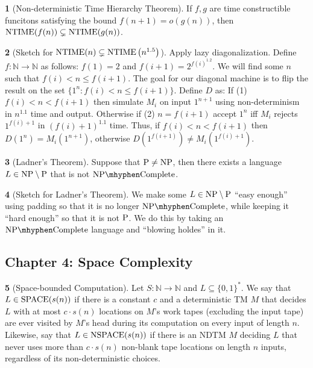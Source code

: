 \documentclass[10pt]{article}
\theoremstyle{definition}
\newtheorem{note}{}[section]
\begin{document}
\begin{note}[Non-deterministic Time Hierarchy Theorem]
  If $f, g$ are time constructible funcitons satisfying the bound
  $f(n + 1) = o(g(n))$,
  then $\mathrm{NTIME}(f(n)) \subsetneq \mathrm{NTIME}(g(n))$.
\end{note}

\begin{note}[Sketch for $\mathrm{NTIME}(n) \subsetneq \mathrm{NTIME}\left(n^{1.5}\right)$]
Apply lazy diagonalization.
Define $f : \mathbb{N} \to \mathbb{N}$ as follows: $f(1) = 2$
and $f(i + 1) = 2^{f(i)^{1.2}}$.
We will find some $n$ such that $f(i) < n \leq f(i + 1)$.
The goal for our diagonal machine is to flip the result on the
set $\{ 1^n : f(i) < n \leq f(i + 1)\}$.
Define $D$ as:
If (1) $f(i) < n < f(i + 1)$ then simulate $M_i$ on input $1 ^{n + 1}$ using
non-determinism in $n^{1.1}$ time and output.
Otherwise if (2) $n = f(i + 1)$ accept $1^n$ iff $M_i$ rejects
$1^{f(i) + 1}$ in $(f(i) + 1)^{1.1}$ time.
Thus, if $f(i) < n < f(i + 1)$ then
$D\left(1^n\right) = M_i \left(1^{n + 1}\right)$, otherwise
$D\left(1^{f(i + 1)}\right) \neq M_i \left(1^{f(i) + 1}\right)$.
\end{note}

\begin{note}[Ladner's Theorem]
  Suppose that $\mathrm{P} \neq \mathrm{NP}$, then there exists a language
  $L \in \mathrm{NP} \setminus \mathrm{P}$ that is not $\NPC$.
\end{note}

\begin{note}[Sketch for Ladner's Theorem]
  We make some $L \in \mathrm{NP} \setminus \mathrm{P}$ ``easy enough'' using padding so
  that it is no longer $\NPC$, while keeping it ``hard enough'' so that it is
  not $\mathrm{P}$.
  We do this by taking an $\NPC$ language and ``blowing holdes'' in it.
\end{note}

\subsection*{Chapter 4: Space Complexity}
\begin{note}[Space-bounded Computation]
  Let $S : \mathbb{N} \to \mathbb{N}$ and $L \subseteq \{0, 1\}^\ast$.
  We say that $L \in \mathrm{SPACE}(s(n))$ if there is a constant $c$ and
  a deterministic TM $M$ that
  decides $L$ with at most $c \cdot s(n)$ locations on
  $M$'s work tapes (excluding the input tape) are ever visited by $M$'s head 
  during its computation on every input of length $n$.
  Likewise, say that $L \in \mathrm{NSPACE}(s(n))$ if there is an NDTM $M$ deciding
  $L$ that never uses more than $c \cdot s(n)$ non-blank tape locations on
  length $n$ inputs, regardless of its non-deterministic choices.
\end{note}
\end{document}
